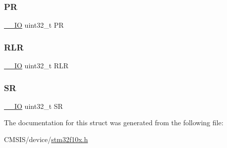 \mbox{\label{struct_i_w_d_g___type_def_af8d25514079514d38c104402f46470af}} 
\subsubsection{\texorpdfstring{PR}{PR}}
{\footnotesize\ttfamily \mbox{\hyperlink{core__sc300_8h_aec43007d9998a0a0e01faede4133d6be}{\+\_\+\+\_\+\+IO}} uint32\+\_\+t PR}

\mbox{\label{struct_i_w_d_g___type_def_a7015e1046dbd3ea8783b33dc11a69e52}} 
\subsubsection{\texorpdfstring{RLR}{RLR}}
{\footnotesize\ttfamily \mbox{\hyperlink{core__sc300_8h_aec43007d9998a0a0e01faede4133d6be}{\+\_\+\+\_\+\+IO}} uint32\+\_\+t R\+LR}

\mbox{\label{struct_i_w_d_g___type_def_af6aca2bbd40c0fb6df7c3aebe224a360}} 
\subsubsection{\texorpdfstring{SR}{SR}}
{\footnotesize\ttfamily \mbox{\hyperlink{core__sc300_8h_aec43007d9998a0a0e01faede4133d6be}{\+\_\+\+\_\+\+IO}} uint32\+\_\+t SR}



The documentation for this struct was generated from the following file\+:\begin{DoxyCompactItemize}
\item 
C\+M\+S\+I\+S/device/\mbox{\hyperlink{stm32f10x_8h}{stm32f10x.\+h}}\end{DoxyCompactItemize}
